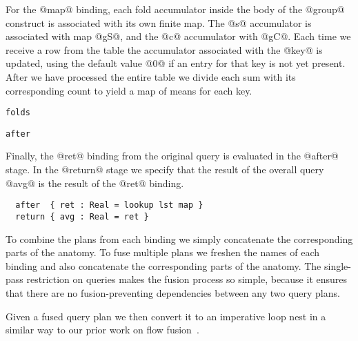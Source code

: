 For the @map@ binding, each fold accumulator inside the body of the @group@ construct is associated with its own finite map. The @s@ accumulator is associated with map @gS@, and the @c@ accumulator with @gC@. Each time we receive a row from the table the accumulator associated with the @key@ is updated, using the default value @0@ if an entry for that key is not yet present. After we have processed the entire table we divide each sum with its corresponding count to yield a map of means for each key.
\begin{alltt}
  folds  

  after  
\end{alltt}


Finally, the @ret@ binding from the original query is evaluated in the @after@ stage. In the @return@ stage we specify that the result of the overall query @avg@ is the result of the @ret@ binding.
\begin{lstlisting}
  after  { ret : Real = lookup lst map }
  return { avg : Real = ret }
\end{lstlisting}


To combine the plans from each binding we simply concatenate the corresponding parts of the anatomy. To fuse multiple plans we freshen the names of each binding and also concatenate the corresponding parts of the anatomy. The single-pass restriction on queries makes the fusion process so simple, because it ensures that there are no fusion-preventing dependencies between any two query plans. 

Given a fused query plan we then convert it to an imperative loop nest in a similar way to our prior work on flow fusion~\cite{lippmeier2013data}.

